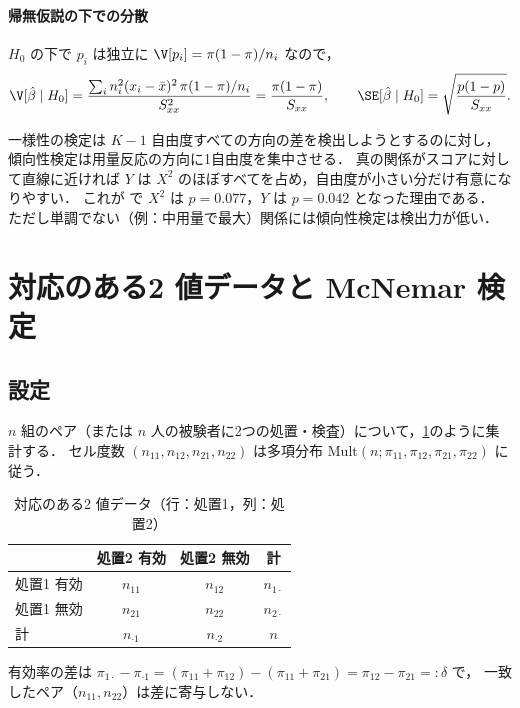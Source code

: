 \paragraph{帰無仮説の下での分散}
$H_0$ の下で $p_i$ は独立に $\V[p_i]=\pi(1-\pi)/n_i$ なので，
\[
\V[\hat\beta\mid H_0]=\frac{\sum_in_i^2(x_i-\bar x)^2\,\pi(1-\pi)/n_i}{S_{xx}^2}=\frac{\pi(1-\pi)}{S_{xx}},\qquad
\SE[\hat\beta\mid H_0]=\sqrt{\frac{p(1-p)}{S_{xx}}}.
\]
一様性の検定は $K-1$ 自由度すべての方向の差を検出しようとするのに対し，傾向性検定は用量反応の方向に1自由度を集中させる．
真の関係がスコアに対して直線に近ければ $Y$ は $X^2$ のほぼすべてを占め，自由度が小さい分だけ有意になりやすい．
これが  で $X^2$ は $p=0.077$，$Y$ は $p=0.042$ となった理由である．
ただし単調でない（例：中用量で最大）関係には傾向性検定は検出力が低い．

\section{対応のある2 値データと McNemar 検定}\label{sec:04-mcnemar}
\Hissu\Hinshutsu
\subsection{設定}
$n$ 組のペア（または $n$ 人の被験者に2つの処置・検査）について，\cref{tab:04-paired}のように集計する．
セル度数 $(n_{11},n_{12},n_{21},n_{22})$ は多項分布 $\mathrm{Mult}(n;\pi_{11},\pi_{12},\pi_{21},\pi_{22})$ に従う．
\begin{table}[htbp]
\centering\small
\caption{対応のある2 値データ（行：処置1，列：処置2）}\label{tab:04-paired}
\begin{tabular}{@{}lccc@{}}
\toprule
 & 処置2 有効 & 処置2 無効 & 計\\
\midrule
処置1 有効 & $n_{11}$ & $n_{12}$ & $n_{1\cdot}$\\
処置1 無効 & $n_{21}$ & $n_{22}$ & $n_{2\cdot}$\\
\midrule
計 & $n_{\cdot1}$ & $n_{\cdot2}$ & $n$\\
\bottomrule
\end{tabular}
\end{table}
有効率の差は $\pi_{1\cdot}-\pi_{\cdot1}=(\pi_{11}+\pi_{12})-(\pi_{11}+\pi_{21})=\pi_{12}-\pi_{21}=:\delta$ で，
一致したペア（$n_{11},n_{22}$）は差に寄与しない．

